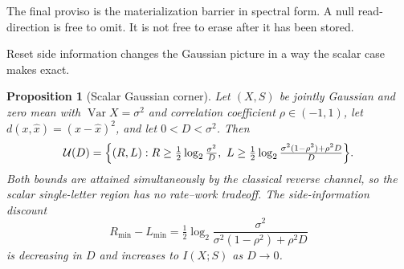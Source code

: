 \documentclass[letterpaper,onecolumn]{IEEEtran}
\newtheorem{proposition}{Proposition}
\theoremstyle{definition}
\theoremstyle{remark}
\newcommand{\1}{\mathbf{1}}
\begin{document}
The final proviso is the materialization barrier in spectral form. A null
read-direction is free to omit. It is not free to erase after it has been
stored.

Reset side information changes the Gaussian picture in a way the scalar case
makes exact.

\begin{proposition}[Scalar Gaussian corner]\label{prop:scalar-corner}
Let $(X,S)$ be jointly Gaussian and zero mean with $\operatorname{Var}X=\sigma^2$
and correlation coefficient $\rho\in(-1,1)$, let
$d(x,\hat x)=(x-\hat x)^2$, and let $0<D<\sigma^2$. Then
\begin{equation}
 \mathcal U(D)
 =\Bigl\{(R,L):
 R\ge\tfrac12\log_2\tfrac{\sigma^2}{D},\
 L\ge\tfrac12\log_2\tfrac{\sigma^2(1-\rho^2)+\rho^2D}{D}
 \Bigr\}.
 \label{eq:scalar-corner}
\end{equation}
Both bounds are attained simultaneously by the classical reverse channel, so
the scalar single-letter region has no rate--work tradeoff. The side-information
discount
\begin{equation}
 R_{\min}-L_{\min}
 =\tfrac12\log_2\frac{\sigma^2}{\sigma^2(1-\rho^2)+\rho^2D}
 \label{eq:discount}
\end{equation}
is decreasing in $D$ and increases to $I(X;S)$ as $D\to0$.
\end{proposition}
\end{document}

